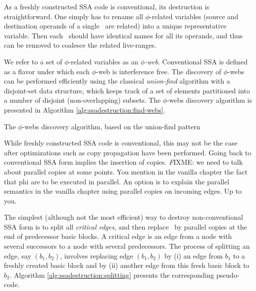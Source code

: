 As a freshly constructed SSA code is conventional, its destruction is straightforward.
One simply has to rename all 
$\phi$-related variables (source and destination operands of
a single \phiop\ are related)
into a unique representative variable.
Then each \phiop\ should have identical names for all its operands,
and thus can be removed to coalesce the related live-ranges.

We refer to a set of $\phi$-related variables as
an \textit{$\phi$-web}. Conventional SSA is defined as a flavor under which each $\phi$-web is interference free. The discovery of $\phi$-webs can be performed efficiently 
using the classical \textit{union-find} algorithm 
with a disjoint-set data structure,
which keeps track of a set of elements
partitioned into a number of disjoint (non-overlapping) subsets.
The $\phi$-webs discovery algorithm is presented in 
Algorithm \ref{alg:ssadestruction:find-webs}.

\begin{algorithm}
\caption{\label{alg:ssadestruction:find-webs}The $\phi$-webs discovery algorithm, based on the union-find pattern}
\end{algorithm}


While freshly constructed SSA code is conventional, 
this may not be the case after optimizations 
such as copy propagation have been performed.
Going back to conventional SSA form implies the insertion of copies.
{\emph FIXME: we need to talk about parallel copies at some points. You mention in the vanilla chapter the fact that phi are to be executed in parallel. An option is to explain the parallel semantics in the vanilla chapter using parallel copies on incoming edges. Up to you.}

The simplest (although not the most efficient) way to destroy non-conventional SSA form is to split all \textit{critical edges}, and then replace \phiops\ by parallel copies at the end of predecessor basic blocks.
A critical edge is an edge from a node with several successors to a node with several predecessors.
The process of splitting an edge, say $(b_1,b_2)$,
involves replacing edge $(b_1, b_2)$ by (i) an
edge from $b_1$ to a freshly created basic block 
and by (ii) another edge from this fresh basic block to $b_2$. 
Algorithm \ref{alg:ssadestruction:splitting} presents
the corresponding pseudo-code.

